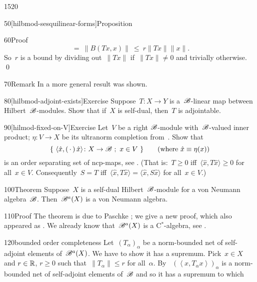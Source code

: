 \begin{parsec}{1520}
\begin{point}{50}[hilbmod-sesquilinear-forms]{Proposition}
\begin{point}{60}{Proof}
\begin{equation*}
            \ =\  \| B (Tx, x) \|
            \ \leq\  r \|Tx\|\|x\|.
\end{equation*}
So~$r$ is a bound
    by dividing out~$\| T x \|$
    if~$\| Tx \| \neq 0$
    and trivially otherwise.  \qed
\end{point}
\begin{point}{70}{Remark}%
In  a more general result was shown.
\end{point}
\end{point}
\begin{point}{80}[hilbmod-adjoint-exists]{Exercise}%
Suppose~$T\colon X \to Y$ is a~$\mathscr{B}$-linear map between
    Hilbert~$\mathscr{B}$-modules.
Show that if~$X$ is self-dual,
    then~$T$ is adjointable.
\end{point}
\begin{point}{90}[hilmod-fixed-on-V]{Exercise}%
Let~$V$ be a right $\mathscr{B}$-module with~$\mathscr{B}$-valued inner product;
    $\eta\colon V \to X$ be its ultranorm completion
    from~.
Show that
\begin{equation*}
    \{\ \langle \hat{x}, (\,\cdot\,)\, \hat{x}\rangle \colon X \to \mathscr{B} \ ;\ x \in V\  \} \qquad \text{(where $\hat{x} \equiv \eta(x)$)}
\end{equation*}
is an order separating set of ncp-maps, see .
    (That is:~$T \geq 0$ iff~$\langle \hat{x}, T \hat{x}\rangle \geq 0$
    for all~$x \in V$.
    Consequently~$S = T$ iff~$\langle \hat{x}, T \hat{x} \rangle 
    = \langle \hat{x}, S \hat{x} \rangle$ for all~$x \in V$.)
\end{point}
\begin{point}{100}{Theorem}%
Suppose~$X$ is a self-dual Hilbert~$\mathscr{B}$-module
    for a von Neumann algebra~$\mathscr{B}$.
Then~$\mathscr{B}^a(X)$ is a von Neumann algebra.
\begin{point}{110}{Proof}%
The theorem is due to Paschke \cite[Prop.~3.10]{paschke};
    we give a new proof, which also appeared as .
We already know that~$\mathscr{B}^a(X)$ is a C$^*$-algebra, see .
\begin{point}{120}{bounded order completeness}%
Let~$(T_\alpha)_\alpha$ be a norm-bounded net of self-adjoint elements
    of~$\mathscr{B}^a(X)$.  We have to show it has a supremum.
Pick~$x\in X$ and  $r\in \mathbb{R}$, $r\geq0 $
such that~$\|T_\alpha\| \leq r$ for all~$\alpha$.
By ~$(\left<x,T_\alpha x\right>)_\alpha$
    is a norm-bounded net of self-adjoint elements of~$\mathscr{B}$
    and so it has a supremum to which

\end{point}
\end{point}
\end{point}
\end{parsec}
